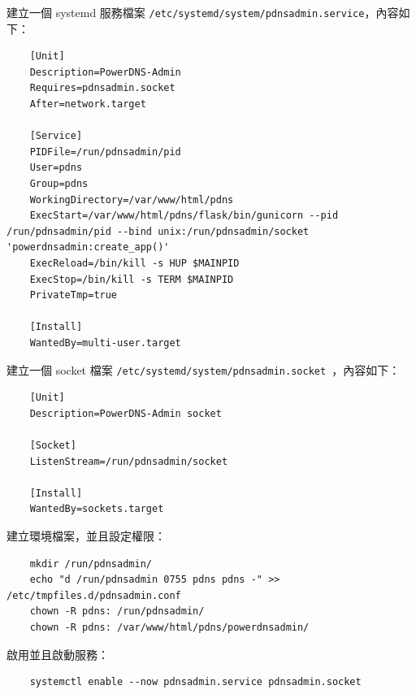 \item 建立一個 systemd 服務檔案 \texttt{/etc/systemd/system/pdnsadmin.service}，內容如下：
  \begin{verbatim}
    [Unit]
    Description=PowerDNS-Admin
    Requires=pdnsadmin.socket
    After=network.target

    [Service]
    PIDFile=/run/pdnsadmin/pid
    User=pdns
    Group=pdns
    WorkingDirectory=/var/www/html/pdns
    ExecStart=/var/www/html/pdns/flask/bin/gunicorn --pid /run/pdnsadmin/pid --bind unix:/run/pdnsadmin/socket 'powerdnsadmin:create_app()'
    ExecReload=/bin/kill -s HUP $MAINPID
    ExecStop=/bin/kill -s TERM $MAINPID
    PrivateTmp=true

    [Install]
    WantedBy=multi-user.target
  \end{verbatim}
\item 建立一個 socket 檔案 \texttt{/etc/systemd/system/pdnsadmin.socket
}，內容如下：
  \begin{verbatim}
    [Unit]
    Description=PowerDNS-Admin socket

    [Socket]
    ListenStream=/run/pdnsadmin/socket

    [Install]
    WantedBy=sockets.target
  \end{verbatim}
\item 建立環境檔案，並且設定權限：
  \begin{verbatim}
    mkdir /run/pdnsadmin/
    echo "d /run/pdnsadmin 0755 pdns pdns -" >> /etc/tmpfiles.d/pdnsadmin.conf
    chown -R pdns: /run/pdnsadmin/
    chown -R pdns: /var/www/html/pdns/powerdnsadmin/
    \end{verbatim}
\item 啟用並且啟動服務：
  \begin{verbatim}
    systemctl enable --now pdnsadmin.service pdnsadmin.socket
  \end{verbatim}

